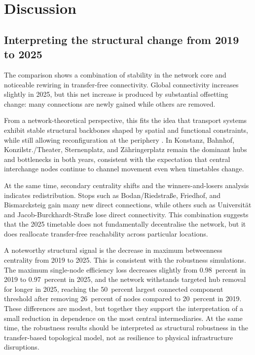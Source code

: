 \documentclass[12pt,a4paper,oneside]{report}
\begin{document}
\chapter{Discussion}\label{ch:discussion}

\section{Interpreting the structural change from 2019 to 2025}\label{sec:interp}

The comparison shows a combination of stability in the network core and noticeable rewiring in transfer-free connectivity.
Global connectivity increases slightly in 2025, but this net increase is produced by substantial offsetting change: many connections are newly gained while others are removed.

From a network-theoretical perspective, this fits the idea that transport systems exhibit stable structural backbones shaped by spatial and functional constraints, while still allowing reconfiguration at the periphery \citep{barthelemy2011}.
In Konstanz, Bahnhof, Konzilstr./Theater, Sternenplatz, and Z\"{a}hringerplatz remain the dominant hubs and bottlenecks in both years, consistent with the expectation that central interchange nodes continue to channel movement even when timetables change.

At the same time, secondary centrality shifts and the winners-and-losers analysis indicates redistribution.
Stops such as Bodan/Riedstra\ss{}e, Friedhof, and Bismarcksteig gain many new direct connections, while others such as Universit\"{a}t and Jacob-Burckhardt-Stra\ss{}e lose direct connectivity.
This combination suggests that the 2025 timetable does not fundamentally decentralise the network, but it does reallocate transfer-free reachability across particular locations.

A noteworthy structural signal is the decrease in maximum betweenness centrality from 2019 to 2025.
This is consistent with the robustness simulations.
The maximum single-node efficiency loss decreases slightly from 0.98~percent in 2019 to 0.97~percent in 2025, and the network withstands targeted hub removal for longer in 2025, reaching the 50~percent largest connected component threshold after removing 26~percent of nodes compared to 20~percent in 2019.
These differences are modest, but together they support the interpretation of a small reduction in dependence on the most central intermediaries.
At the same time, the robustness results should be interpreted as structural robustness in the transfer-based topological model, not as resilience to physical infrastructure disruptions.
\end{document}
